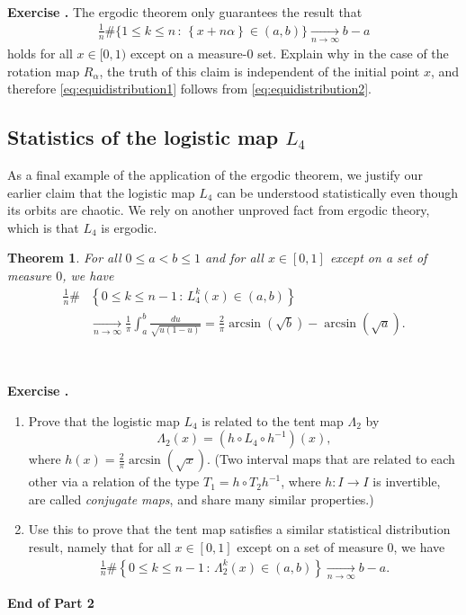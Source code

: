 \documentclass[12pt]{amsart}
\newcommand{\eq}[1]{\begin{equation}\begin{split}#1\end{split}\end{equation}}
\newcommand{\eqst}[1]{\begin{align*}#1\end{align*}}
\newtheorem{thm}{Theorem}
\newcounter{example}
\newcounter{exercise}
\newcommand{\beginexer}{\ \\ \addtocounter{exercise}{1} \textbf{Exercise \arabic{exercise}.} }
\begin{document}
\beginexer The ergodic theorem only guarantees the result that
\eq{ \label{eq:equidistribution2}
\frac{1}{n} \#\Big\{ 1\le k \le n \,:\, \left\{x+n\alpha\right\} \in (a,b) \Big\} \xrightarrow[n\to\infty]{} b-a
}
holds for all $x\in [0,1)$ except on a measure-0 set. Explain why in the case of the rotation map $R_\alpha$, the truth of this claim is independent of the initial point $x$, and therefore \eqref{eq:equidistribution1} follows from \eqref{eq:equidistribution2}.

\subsection{Statistics of the logistic map $L_4$}

As a final example of the application of the ergodic theorem, we justify our earlier claim that the logistic map $L_4$ can be understood statistically even though its orbits are chaotic. We rely on another unproved fact from ergodic theory, which is that $L_4$ is  ergodic.

\begin{thm} For all $0\le a<b\le 1$ and for all $x\in[0,1]$ except on a set of measure $0$, we have
\eqst{
\frac{1}{n}\# &\left\{ 0\le k\le n-1\,:\, L_4^k(x) \in (a,b) \right\} 
\\ & \xrightarrow[n\to\infty]{} \frac{1}{\pi} \int_a^b \frac{du}{\sqrt{u(1-u)}}
= \frac{2}{\pi}\arcsin(\sqrt{b})-\arcsin(\sqrt{a}).
}
\end{thm}

\beginexer \begin{enumerate}
\item Prove that the logistic map $L_4$ is related to the tent map $\Lambda_2$ by
$$ \Lambda_2(x) = (h\circ L_4 \circ h^{-1})(x), $$
where $h(x) = \frac{2}{\pi}\arcsin(\sqrt{x})$. (Two interval maps that are related to each other via a relation of the type $T_1=h\circ T_2 h^{-1}$, where $h:I\to I$ is invertible, are called \emph{conjugate maps}, and share many similar properties.)
\item Use this to prove that the tent map satisfies a similar statistical distribution result, namely that for all $x\in[0,1]$ except on a set of measure 0, we have
\eqst{
\frac{1}{n}\#\left\{ 0\le k\le n-1\,:\, \Lambda_2^k(x) \in (a,b) \right\} \xrightarrow[n\to\infty]{} b-a.
}
\end{enumerate}




\vspace{30.0pt}
\begin{center}
\textbf{End of Part 2}
\end{center}
\end{document}
